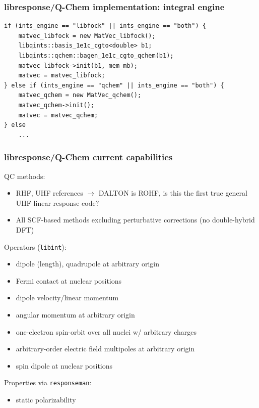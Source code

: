 \documentclass[%
    xcolor=usenames,dvipsnames,svgnames%
]{beamer}
\begin{document}
\begin{frame}[fragile]
  \frametitle{libresponse/Q-Chem implementation: integral engine}
  \scriptsize
  \begin{verbatim}
if (ints_engine == "libfock" || ints_engine == "both") {
    matvec_libfock = new MatVec_libfock();
    libqints::basis_1e1c_cgto<double> b1;
    libqints::qchem::bagen_1e1c_cgto_qchem(b1);
    matvec_libfock->init(b1, mem_mb);
    matvec = matvec_libfock;
} else if (ints_engine == "qchem" || ints_engine == "both") {
    matvec_qchem = new MatVec_qchem();
    matvec_qchem->init();
    matvec = matvec_qchem;
} else
    ...
  \end{verbatim}
\end{frame}

\begin{frame}
  \frametitle{libresponse/Q-Chem current capabilities}
  QC methods:
  \begin{itemize}
  \item RHF, UHF references \(\rightarrow\) DALTON is ROHF, is this the first true general UHF linear response code?
  \item All SCF-based methods excluding perturbative corrections (no double-hybrid DFT)
  \end{itemize}
  Operators (\texttt{libint}):
  \begin{itemize}
  \item dipole (length), quadrupole at arbitrary origin
  \item Fermi contact at nuclear positions
  \item dipole velocity/linear momentum
  \item angular momentum at arbitrary origin
  \item one-electron spin-orbit over all nuclei w/ arbitrary charges
  \item arbitrary-order electric field multipoles at arbitrary origin
  \item spin dipole at nuclear positions
  \end{itemize}
  Properties via \texttt{responseman}:
  \begin{itemize}
  \item static polarizability
  \end{itemize}
\end{frame}
\end{document}
